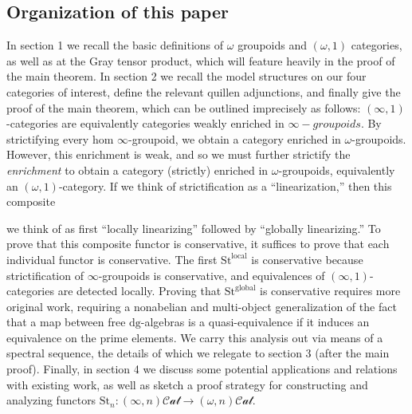 \documentclass[12pt]{article}
\theoremstyle{definition}
\newcommand{\C}{\mathcal{C}}
\newcommand{\sset}{\text{sSet}}
\newcommand{\stinfty}{\omega\text{Gpd}}
\newcommand{\st}{\text{St}}
\begin{document}
\subsection{Organization of this paper}
	In section 1 we recall the basic definitions of $\omega$ groupoids and $(\omega,1)$ categories, as well as at the Gray tensor product, which will feature heavily in the proof of the main theorem. In section 2 we recall the model structures on our four categories of interest, define the relevant quillen adjunctions, and finally give the proof of the main theorem, which can be outlined imprecisely as follows: $(\infty,1)$-categories are equivalently categories weakly enriched in $\infty-groupoids$.
	By strictifying every hom $\infty$-groupoid, we obtain a category enriched in $\omega$-groupoids. 
	However, this enrichment is weak, and so we must further strictify the \textit{enrichment} to obtain a category (strictly) enriched in $\omega$-groupoids, equivalently an $(\omega,1)$-category.
	If we think of strictification as a ``linearization,'' then this composite
	\begin{center}
	\end{center}
	we think of as first ``locally linearizing'' followed by ``globally linearizing.''
	To prove that this composite functor is conservative, it suffices to prove that each individual functor is conservative. 
	The first $\st^{\text{local}}$ is conservative because strictification of $\infty$-groupoids is conservative, and equivalences of $(\infty,1)$-categories are detected locally. 
	Proving that $\st^{\text{global}}$ is conservative requires more original work, requiring a nonabelian and multi-object generalization of the fact that a map between free $\text{dg}$-algebras is a quasi-equivalence if it induces an equivalence on the prime elements.
	We carry this analysis out via means of a spectral sequence, the details of which we relegate to section 3 (after the main proof). Finally, in section 4 we discuss some potential applications and relations with existing work, as well as sketch a proof strategy for constructing and analyzing functors $\st_n: (\infty,n)\mathcal{Cat} \to (\omega,n)\mathcal{Cat}$. 
\end{document}
